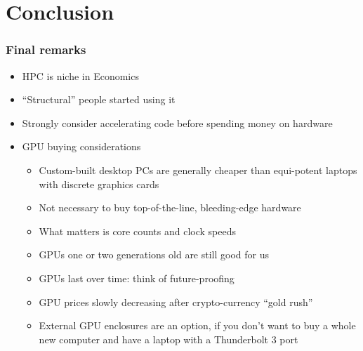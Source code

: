 \documentclass[10pt, aspectratio=1610]{beamer}
\begin{document}
\section{Conclusion}

\begin{frame}
  \frametitle{Final remarks}

  \begin{itemize}
    \item HPC is niche in Economics
    \item ``Structural'' people started using it
    \item Strongly consider accelerating code before spending money on hardware

    \vfill

    \item GPU buying considerations
      \begin{itemize}
        \item Custom-built desktop PCs are generally cheaper than equi-potent laptops with discrete graphics cards
        \item Not necessary to buy top-of-the-line, bleeding-edge hardware
        \item What matters is core counts and clock speeds
        \item GPUs one or two generations old are still good for us
        \item GPUs last over time: think of future-proofing
        \item GPU prices slowly decreasing after crypto-currency ``gold rush''
        \item External GPU enclosures are an option, if you don't want to buy a whole new computer and have a laptop with a Thunderbolt 3 port
      \end{itemize}
  \end{itemize}

\end{frame}
\end{document}
